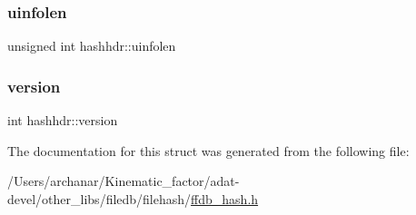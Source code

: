 \mbox{\label{structhashhdr_a5630409e6445f62540f56b8bed738de0}} 
\subsubsection{\texorpdfstring{uinfolen}{uinfolen}}
{\footnotesize\ttfamily unsigned int hashhdr\+::uinfolen}

\mbox{\label{structhashhdr_a482cd2214ac811ec00b887e2de4280b0}} 
\subsubsection{\texorpdfstring{version}{version}}
{\footnotesize\ttfamily int hashhdr\+::version}



The documentation for this struct was generated from the following file\+:\begin{DoxyCompactItemize}
\item 
/\+Users/archanar/\+Kinematic\+\_\+factor/adat-\/devel/other\+\_\+libs/filedb/filehash/\mbox{\hyperlink{adat-devel_2other__libs_2filedb_2filehash_2ffdb__hash_8h}{ffdb\+\_\+hash.\+h}}\end{DoxyCompactItemize}
